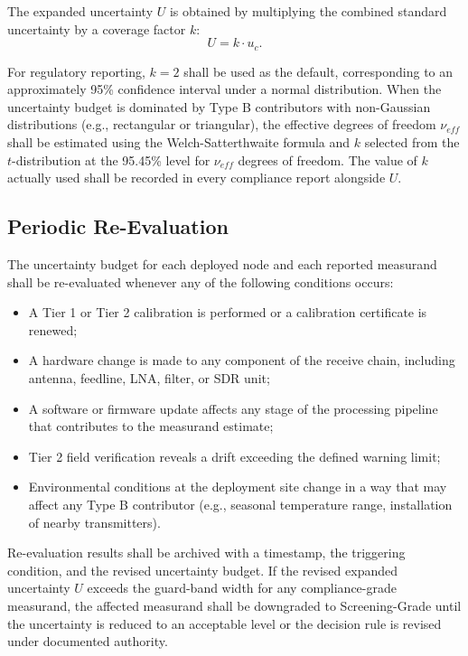 \documentclass[11pt]{article}
\begin{document}
The expanded uncertainty $U$ is obtained by multiplying the combined standard uncertainty by a coverage factor $k$:
\begin{equation}
U = k \cdot u_c.
\label{eq:expanded}
\end{equation}

For regulatory reporting, $k=2$ shall be used as the default, corresponding to an approximately 95\% confidence interval under a normal distribution. When the uncertainty budget is dominated by Type B contributors with non-Gaussian distributions (e.g., rectangular or triangular), the effective degrees of freedom $\nu_{eff}$ shall be estimated using the Welch-Satterthwaite formula and $k$ selected from the $t$-distribution at the 95.45\% level for $\nu_{eff}$ degrees of freedom. The value of $k$ actually used shall be recorded in every compliance report alongside $U$.

\subsection*{Periodic Re-Evaluation}

The uncertainty budget for each deployed node and each reported measurand shall be re-evaluated whenever any of the following conditions occurs:
\begin{itemize}
    \item A Tier 1 or Tier 2 calibration is performed or a calibration certificate is renewed;
    \item A hardware change is made to any component of the receive chain, including antenna, feedline, LNA, filter, or SDR unit;
    \item A software or firmware update affects any stage of the processing pipeline that contributes to the measurand estimate;
    \item Tier 2 field verification reveals a drift exceeding the defined warning limit;
    \item Environmental conditions at the deployment site change in a way that may affect any Type B contributor (e.g., seasonal temperature range, installation of nearby transmitters).
\end{itemize}

Re-evaluation results shall be archived with a timestamp, the triggering condition, and the revised uncertainty budget. If the revised expanded uncertainty $U$ exceeds the guard-band width for any compliance-grade measurand, the affected measurand shall be downgraded to Screening-Grade until the uncertainty is reduced to an acceptable level or the decision rule is revised under documented authority.
\end{document}
